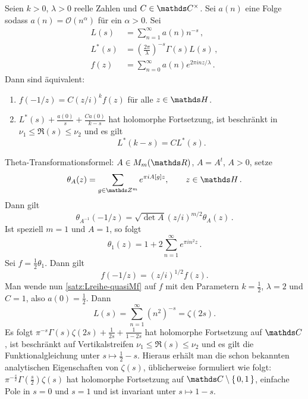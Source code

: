 \begin{satz}\label{satz:Lreihe-quasiMf}
	Seien $k > 0$, $\lambda >0$ reelle Zahlen und $C \in \CC^\times$. Sei $a(n)$ eine Folge sodass $a(n) = \mathcal O(n^\alpha)$ für ein $\alpha > 0$. Sei
	\begin{align*}
	L(s) &= \sum_{n=1}^\infty a(n)n^{-s}\,,\\
	L^*(s) &= \left( \frac{2\pi}{\lambda}\right)^{-s} \Gamma(s) L(s)\,,\\
	f(z) &= \sum_{n=0}^\infty a(n)e^{2\pi i nz/\lambda}\,.
	\end{align*}
	Dann sind äquivalent: 
	\begin{enumerate}
		\item $f(-1/z) = C (z/i)^{k} f(z)$ für alle $z \in \HH$.
		\item $L^*(s) + \frac{a(0)}{s} + \frac{Ca(0)}{k - s}$ hat holomorphe Fortsetzung, ist beschränkt in $\nu_1 \leq \Re(s) \leq \nu_2$ und es gilt 
		\[L^*(k - s) = C L^*(s).\]
	\end{enumerate}
\end{satz}


\begin{bsp}
	Theta-Transformationsformel: $A \in M_m(\RR)$, $A = A^t$, $A > 0$, setze
	\[
	\theta_A(z) = \sum_{g \in \ZZ^m} e^{\pi i A[g] z}, \qquad z \in \HH\,.
	\]
	Dann gilt 
	\[
	\theta_{A^{-1}}(-1/z) = \sqrt{\det A} (z / i)^{m/2} \theta_A(z)\,.
	\]
	Ist speziell $m=1$ und $A = 1$, so folgt 
	\[
	\theta_1(z) = 1 + 2\sum_{n=1}^\infty e^{\pi i n^2 z}\,.
	\]
	Sei $f = \frac12 \theta_1$. Dann gilt
	\[
	f(-1/z) = (z/i)^{1/2} f(z).
	\]
	Man wende nun \autoref{satz:Lreihe-quasiMf} auf $f$ mit den Parametern $k = \frac12$, $\lambda = 2$ und $C = 1$, also $a(0) = \frac12$. Dann
	\[
	L(s) = \sum_{n=1}^\infty (n^{2})^{-s} = \zeta(2s).
	\]
	Es folgt $\pi^{-s} \Gamma(s)\zeta(2s) + \frac{1}{2s} + \frac{1}{1-2s}$ hat holomorphe Fortsetzung auf $\CC$, ist beschränkt auf Vertikalstreifen $\nu_1 \leq \Re(s) \leq \nu_2$ und es gilt die Funktionalgleichung unter $s \mapsto \frac12 - s$. Hieraus erhält man die schon bekannten analytischen Eigenschaften von $\zeta(s)$, üblicherweise formuliert wie folgt: $\pi^{- \frac s2}\Gamma(\frac s2)\zeta(s)$ hat holomorphe Fortsetzung auf $\CC \setminus \Set {0,1}$, einfache Pole in $s=0$ und $s=1$ und ist invariant  unter $s \mapsto 1 - s$.
\end{bsp} 